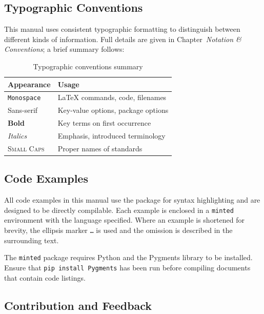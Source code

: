 \subsection*{Typographic Conventions}

This manual uses consistent typographic formatting to distinguish between
different kinds of information.  Full details are given in
Chapter~\emph{Notation \& Conventions}; a brief summary follows:

\begin{table}[htbp]
    \centering
    \caption{Typographic conventions summary}
    \label{tab:typo-summary}
    \begin{tabular}{@{} l l @{}}
        \toprule
        \textbf{Appearance} & \textbf{Usage} \\
        \midrule
        \texttt{Monospace}  & \LaTeX{} commands, code, filenames \\
        \textsf{Sans-serif} & Key-value options, package options \\
        \textbf{Bold}       & Key terms on first occurrence \\
        \emph{Italics}      & Emphasis, introduced terminology \\
        \textsc{Small Caps} & Proper names of standards \\
        \bottomrule
    \end{tabular}
\end{table}

\subsection*{Code Examples}

All code examples in this manual use the  package for
syntax highlighting and are designed to be directly compilable.  Each
example is enclosed in a \texttt{minted} environment with the language
specified.  Where an example is shortened for brevity, the ellipsis marker
\texttt{\ldots} is used and the omission is described in the surrounding
text.

The \texttt{minted} package requires Python and the Pygments library to be
installed.  Ensure that \texttt{pip install Pygments} has been run before
compiling documents that contain code listings.

\subsection*{Contribution and Feedback}

